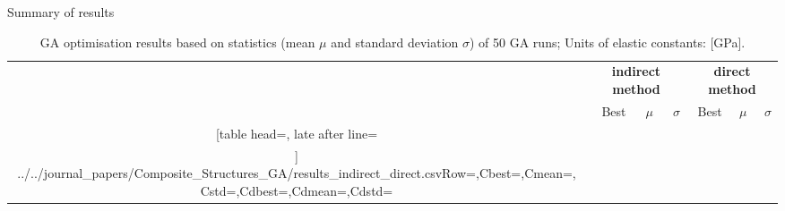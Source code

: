 \documentclass[10pt]{beamer} %
\begin{document}
\begin{frame}[t,label=frame27]{Summary of results}
\begin{table}[h]
	\renewcommand{\arraystretch}{1.3}
	\centering \footnotesize
	\caption{GA optimisation results based on statistics (mean $\mu$ and standard deviation $\sigma$) of 50 GA runs; Units of  elastic constants: [GPa].}	
	\begin{tabular}{crrrrrr} \toprule
		&\multicolumn{3}{c}{\textbf{indirect method}} & \multicolumn{3}{c}{\textbf{direct method} }\\
		\cmidrule(lr){2-4} \cmidrule(lr){5-7} 
		&Best & $\mu$ & $\sigma$& Best& $\mu$ & $\sigma$\\
		\cmidrule(lr){2-4} \cmidrule(lr){5-7} 
		\csvreader[table head=\toprule ,
		late after line=\\ ]%
		{../../journal_papers/Composite_Structures_GA/results_indirect_direct.csv}{Row=\constants,Cbest=\cbest,Cmean=\cmean,Cstd=\cstd,Cdbest=\cdbest,Cdmean=\cdmean,Cdstd=\cdstd}%
		{\constants & \cbest & \cmean & \cstd& \cdbest & \cdmean & \cdstd}%
		\bottomrule
	\end{tabular}	
	\label{tab:csv_results}
\end{table}
\end{frame}
\end{document}
